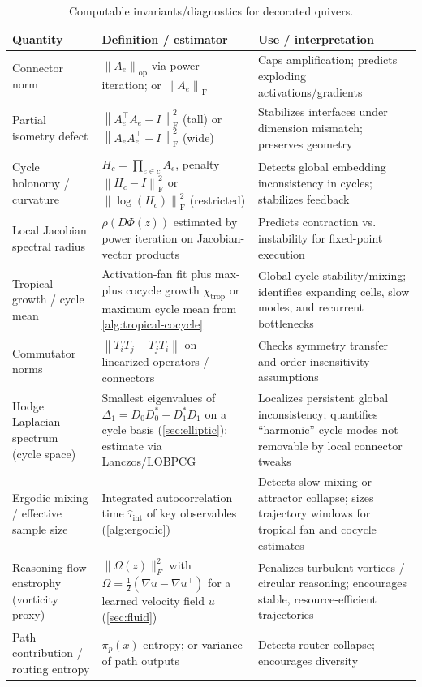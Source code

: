 \documentclass[11pt]{article}
\theoremstyle{definition}
\theoremstyle{plain}
\theoremstyle{remark}
\newcommand{\norm}[1]{\left\lVert #1 \right\rVert}
\newcommand{\opnorm}[1]{\left\lVert #1 \right\rVert_{\mathrm{op}}}
\newcommand{\Frob}[1]{\left\lVert #1 \right\rVert_{\mathrm{F}}}
\begin{document}
\begin{table}[t]
\centering
\small
\begin{tabular}{p{3.3cm}p{6.1cm}p{3.9cm}}
\toprule
\textbf{Quantity} & \textbf{Definition / estimator} & \textbf{Use / interpretation} \\
\midrule
Connector norm &
$\opnorm{A_e}$ via power iteration; or $\Frob{A_e}$ &
Caps amplification; predicts exploding activations/gradients \\
\addlinespace
Partial isometry defect &
$\Frob{A_e^\top A_e-I}^2$ (tall) or $\Frob{A_e A_e^\top-I}^2$ (wide) &
Stabilizes interfaces under dimension mismatch; preserves geometry \\
\addlinespace
Cycle holonomy / curvature &
$H_c=\prod_{e\in c} A_e$, penalty $\Frob{H_c-I}^2$ or $\Frob{\log(H_c)}^2$ (restricted) &
Detects global embedding inconsistency in cycles; stabilizes feedback \\
\addlinespace
Local Jacobian spectral radius &
$\rho(D\Phi(z))$ estimated by power iteration on Jacobian-vector products &
Predicts contraction vs. instability for fixed-point execution \\
\addlinespace
	Tropical growth / cycle mean &
	Activation-fan fit plus max-plus cocycle growth $\chi_{\mathrm{trop}}$ or maximum cycle mean from \cref{alg:tropical-cocycle} &
	Global cycle stability/mixing; identifies expanding cells, slow modes, and recurrent bottlenecks \\
\addlinespace
Commutator norms &
$\norm{T_iT_j-T_jT_i}$ on linearized operators / connectors &
Checks symmetry transfer and order-insensitivity assumptions \\
\addlinespace
Hodge Laplacian spectrum (cycle space) &
Smallest eigenvalues of $\Delta_1 = D_0 D_0^\ast + D_1^\ast D_1$ on a cycle basis (\cref{sec:elliptic}); estimate via Lanczos/LOBPCG &
Localizes persistent global inconsistency; quantifies ``harmonic'' cycle modes not removable by local connector tweaks \\
\addlinespace
	Ergodic mixing / effective sample size &
	Integrated autocorrelation time $\widehat{\tau}_{\mathrm{int}}$ of key observables (\cref{alg:ergodic}) &
	Detects slow mixing or attractor collapse; sizes trajectory windows for tropical fan and cocycle estimates \\
\addlinespace
Reasoning-flow enstrophy (vorticity proxy) &
$\|\Omega(z)\|_F^2$ with $\Omega=\tfrac12(\nabla u-\nabla u^\top)$ for a learned velocity field $u$ (\cref{sec:fluid}) &
Penalizes turbulent vortices / circular reasoning; encourages stable, resource-efficient trajectories \\
\addlinespace
Path contribution / routing entropy &
$\pi_p(x)$ entropy; or variance of path outputs &
Detects router collapse; encourages diversity \\
\bottomrule
\end{tabular}
\caption{Computable invariants/diagnostics for decorated quivers.}
\label{tab:invariants}
\end{table}
\end{document}
